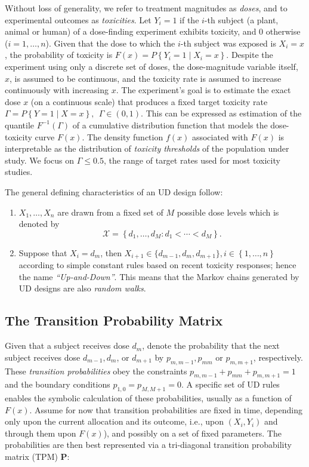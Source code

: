 Without loss of generality, we refer to treatment magnitudes as \emph{doses}, and to experimental outcomes as \emph{toxicities}. Let $Y_i = 1$ if the $i$-th subject (a plant, animal or human) of a dose-finding experiment exhibits toxicity, and $0$ otherwise ($i=1,\ldots ,n$). Given that the dose to which the $i$-th subject was exposed is $X_i=x$, the probability of toxicity is $F(x) = P\left\{Y_i=1\mid X_i =x\right\}$. Despite the experiment using only a discrete set of doses, the dose-magnitude variable itself, $x$, is assumed to be continuous, and the toxicity rate is assumed to increase continuously with increasing $x$.  The experiment's goal is to estimate the exact dose $x$ (on a continuous scale) that produces a fixed target toxicity rate $\Gamma=P\left\{Y=1\mid X=x\right\}, \ \ \Gamma\in(0,1)$. This can be expressed as estimation of the quantile  $F^{-1}(\Gamma)$ of a cumulative distribution function that models the dose-toxicity curve $F(x)$.  The density function $f(x)$ associated with $F(x)$ is interpretable as the distribution of \emph{toxicity thresholds} of the population under study. We focus on $\Gamma\leq 0.5$, the range of target rates used for most toxicity studies.

The general defining characteristics of an UD design follow:
\begin{enumerate}
\item $X_1,\ldots,X_n$ are drawn from a fixed set of $M$ possible dose levels which is denoted by $$\mathcal{X} =\left\{d_1,\ldots ,d_M : d_1 <\cdots <d_M\right\}.$$
\item Suppose that $X_i=d_m$, then $X_{i+1}\in\{d_{m-1},d_m,d_{m+1}\},i\in\left\{1,\ldots ,n\right\}$ according to simple constant rules based on recent toxicity responses; hence the name \emph{``Up-and-Down''}. This means that the Markov chains generated by UD designs are also \emph{random walks}.
\end{enumerate}

\subsection{The Transition Probability Matrix}\label{sec:tpm}

 Given that a subject receives dose $d_m$, denote the probability that the next subject receives dose $d_{m-1},d_m$, or $d_{m+1}$ by $p_{m,m-1},p_{mm}$ or $p_{m,m+1}$, respectively. These  \emph{transition probabilities} obey the constraints $p_{m,m-1}+p_{mm}+p_{m,m+1}=1$ and the boundary conditions $p_{1,0}=p_{M,M+1}=0$. A specific set of UD rules enables the symbolic calculation of these probabilities, usually as a function of $F(x)$. Assume for now that transition probabilities are fixed in time, depending only upon the current allocation and its outcome, i.e., upon $\left(X_i,Y_i\right)$ and through them upon $F(x)$), and possibly on a set of fixed parameters. The probabilities are then best represented via a tri-diagonal transition probability matrix (TPM) $\mathbf{P}$:

